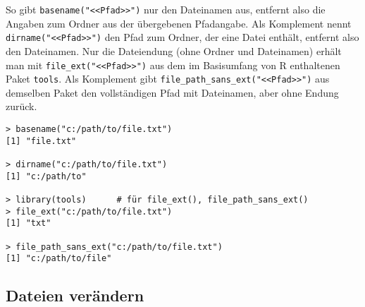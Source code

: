 So gibt \lstinline!basename("<<Pfad>>")! nur den Dateinamen aus, entfernt also die Angaben zum Ordner aus der übergebenen Pfadangabe. Als Komplement nennt \lstinline!dirname("<<Pfad>>")! den Pfad zum Ordner, der eine Datei enthält, entfernt also den Dateinamen. Nur die Dateiendung (ohne Ordner und Dateinamen) erhält man mit \lstinline!file_ext("<<Pfad>>")! aus dem im Basisumfang von R enthaltenen Paket  \lstinline!tools!. Als Komplement gibt \lstinline!file_path_sans_ext("<<Pfad>>")! aus demselben Paket den vollständigen Pfad mit Dateinamen, aber ohne Endung zurück.
\begin{lstlisting}
> basename("c:/path/to/file.txt")
[1] "file.txt"

> dirname("c:/path/to/file.txt")
[1] "c:/path/to"

> library(tools)      # für file_ext(), file_path_sans_ext()
> file_ext("c:/path/to/file.txt")
[1] "txt"

> file_path_sans_ext("c:/path/to/file.txt")
[1] "c:/path/to/file"
\end{lstlisting}

\subsection{Dateien verändern}
\label{sec:filesManip}

